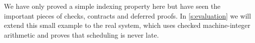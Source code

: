 We have only proved a simple indexing property here but have seen the important pieces of checks, contracts and deferred proofs.
In \autoref{s:evaluation} we will extend this small example to the real system, which uses checked machine-integer arithmetic and proves that scheduling is never late.









